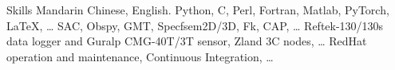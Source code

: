 
\begin{rubric}{Skills}
\entry*[Languages]
	Mandarin Chinese, English.
	Python, C, Perl, Fortran, Matlab, PyTorch, \LaTeX, \ldots
{}
	SAC, Obspy, GMT, Specfsem2D/3D, Fk, CAP, \ldots
\entry*[Instruments]
     Reftek-130/130s data logger and Guralp CMG-40T/3T sensor, Zland 3C nodes, \ldots
\entry*[Misc.]
	RedHat operation and maintenance, Continuous Integration, \ldots
\end{rubric}
